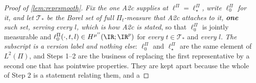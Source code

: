 \begin{proof}[Proof of \cref{lem:reprsmooth}]
%
\emph{Fix the one A2c
supplies at $\ell^\Pi=\ell^\Pi_\star$, write $\ell^\Pi_0$ for it, and let $\mathcal T_\ast$ be the Borel
set of full $\Pi_t$-measure that A2c attaches to it, \textbf{one} such set, serving every $l$, which
is how A2c is stated}, so that $\ell^\Pi_0$ is jointly measurable and
$\ell^\Pi_0(\cdot,t,l)\in H^{\mu''}(\IR;\IR^{p})$ for \emph{every} $t\in\mathcal T_\ast$ and
\emph{every} $l$. \emph{The subscript is a
version label and nothing else}: $\ell^\Pi_0$ and $\ell^\Pi_\star$ are the same element of $L^{2}(\Pi)$,
and Steps 1--2 are the business of replacing the first representative by a second one that has pointwise
properties. They are kept apart because the whole of Step 2 is a statement relating them, and a

\end{proof}

